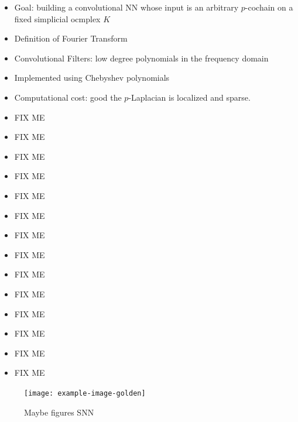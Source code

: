 \begin{itemize}
\item Goal: building a convolutional NN whose input is an arbitrary $p$-cochain on a fixed simplicial ocmplex $K$
\item  Definition of Fourier Transform
\item Convolutional Filters: low degree polynomials in the frequency domain
\item Implemented using Chebyshev polynomials
\item Computational cost: good the $p$-Laplacian is localized and sparse.
\item FIX ME
\item FIX ME
\item FIX ME
\item FIX ME
\item FIX ME
\item FIX ME
\item FIX ME
\item FIX ME
\item FIX ME
\item FIX ME
\item FIX ME
\item FIX ME
\item FIX ME
\item FIX ME
\end{itemize}

\begin{figure}[htbp]
  \centering

\texttt{[image: example-image-golden]}
  \caption{Maybe figures SNN} \label{fig:SNN}
\end{figure}